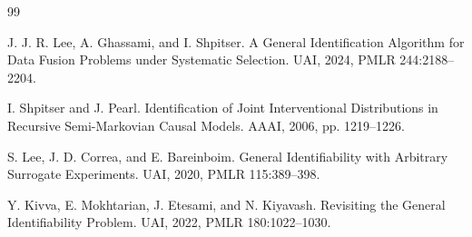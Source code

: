\documentclass{article}
\begin{document}
\begin{thebibliography}{99}

   J. J. R. Lee, A. Ghassami, and I. Shpitser. A General Identification Algorithm for Data Fusion Problems under Systematic Selection. UAI, 2024, PMLR 244:2188--2204.

   I. Shpitser and J. Pearl. Identification of Joint Interventional Distributions in Recursive Semi-Markovian Causal Models. AAAI, 2006, pp. 1219--1226.

   S. Lee, J. D. Correa, and E. Bareinboim. General Identifiability with Arbitrary Surrogate Experiments. UAI, 2020, PMLR 115:389--398.

   Y. Kivva, E. Mokhtarian, J. Etesami, and N. Kiyavash. Revisiting the General Identifiability Problem. UAI, 2022, PMLR 180:1022--1030.

\end{thebibliography}
\end{document}
